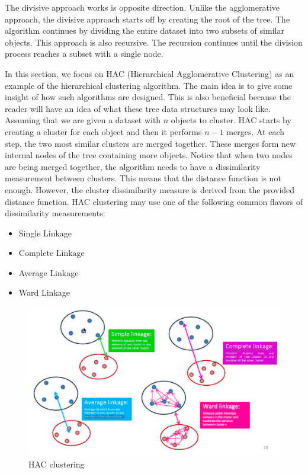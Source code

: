 \documentclass[a4paper, 12pt]{article}
\begin{document}
The divisive approach works is opposite direction. Unlike the agglomerative approach, the divisive approach starts off by creating the root of the tree. The algorithm continues by dividing the entire dataset into two subsets of similar objects. This approach is also recursive. The recursion continues until the division process reaches a subset with a single node. 

In this section, we focus on HAC (Hierarchical Agglomerative Clustering) as an example of the hierarchical clustering algorithm. The main idea is to give some insight of how such algorithms are designed. This is also beneficial because the reader will have an idea of what these tree data structures may look like. Assuming that we are given a dataset with $n$ objects to cluster. HAC starts by creating a cluster for each object and then it performs $n - 1$ merges. At each step, the two most similar clusters are merged together. These merges form new internal nodes of the tree containing more objects. Notice that when two nodes are being merged together, the algorithm needs to have a dissimilarity measurement between clusters. This means that the distance function is not enough. However, the cluster dissimilarity measure is derived from the provided distance function. HAC clustering may use one of the following common flavors of dissimilarity measurements:
\begin{itemize}
    \item Single Linkage
    \item Complete Linkage
    \item Average Linkage
    \item Ward Linkage
\end{itemize}

\begin{figure}[ht]
    \centering
    \includegraphics[width=1\textwidth]{HAC Clustering.png}
    \caption{HAC clustering \citep{hierarchicaltutorial2017}}
\end{figure}
\end{document}

